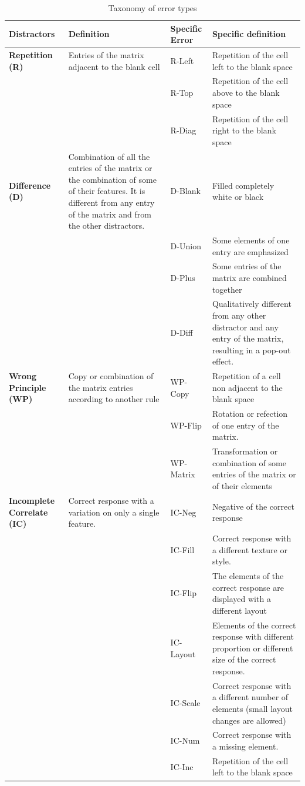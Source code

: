 \begin{table}

\caption{\label{tab:tab-error-types-static}Taxonomy of error types}
\centering
\begin{tabular}[t]{>{}l|l|l|l}
\hline
Distractors & Definition & Specific Error & Specific definition\\
\hline
\textbf{Repetition (R)} & Entries of the matrix adjacent to the blank cell & R-Left & Repetition of the cell left to the blank space\\
\hline
\textbf{} &  & R-Top & Repetition of the cell above to the blank space\\
\hline
\textbf{} &  & R-Diag & Repetition of the cell right to the blank space\\
\hline
\textbf{Difference (D)} & Combination of all the entries of the matrix or the combination of some of their features. It is different from any entry of the matrix and from the other distractors. & D-Blank & Filled completely white or black\\
\hline
\textbf{} &  & D-Union & Some elements of one entry are emphasized\\
\hline
\textbf{} &  & D-Plus & Some entries of the matrix are combined together\\
\hline
\textbf{} &  & D-Diff & Qualitatively different from any other distractor and any entry of the matrix, resulting in a pop-out effect.\\
\hline
\textbf{Wrong Principle (WP)} & Copy or combination of the matrix entries according to another rule & WP-Copy & Repetition of a cell non adjacent to the blank space\\
\hline
\textbf{} &  & WP-Flip & Rotation or refection of one entry of the matrix.\\
\hline
\textbf{} &  & WP-Matrix & Transformation or combination of some entries of the matrix or of their elements\\
\hline
\textbf{Incomplete Correlate (IC)} & Correct response with a variation on only a single feature. & IC-Neg & Negative of the correct response\\
\hline
\textbf{} &  & IC-Fill & Correct response with a different texture or style.\\
\hline
\textbf{} &  & IC-Flip & The elements of the correct response are displayed with a different layout\\
\hline
\textbf{} &  & IC-Layout & Elements of the correct response with different proportion or different size of the correct response.\\
\hline
\textbf{} &  & IC-Scale & Correct response with a different number of elements (small layout changes are allowed)\\
\hline
\textbf{} &  & IC-Num & Correct response with a missing element.\\
\hline
\textbf{} &  & IC-Inc & Repetition of the cell left to the blank space\\
\hline
\end{tabular}
\end{table}

